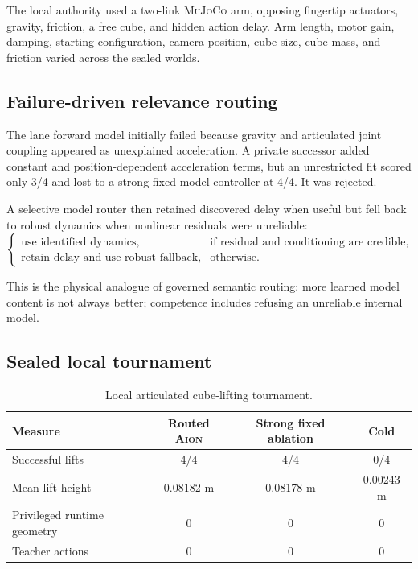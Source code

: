 \documentclass[11pt,a4paper]{article}
\newcommand{\AION}{\textsc{Aion}}
\newcommand{\MuJoCo}{\textsc{MuJoCo}}
\begin{document}
The local authority used a two-link \MuJoCo{} arm, opposing fingertip
actuators, gravity, friction, a free cube, and hidden action delay.  Arm length,
motor gain, damping, starting configuration, camera position, cube size, cube
mass, and friction varied across the sealed worlds.

\subsection{Failure-driven relevance routing}

The lane forward model initially failed because gravity and articulated joint
coupling appeared as unexplained acceleration.  A private successor added
constant and position-dependent acceleration terms, but an unrestricted fit
scored only 3/4 and lost to a strong fixed-model controller at 4/4.  It was
rejected.

A selective model router then retained discovered delay when useful but fell
back to robust dynamics when nonlinear residuals were unreliable:
\begin{equation}
\begin{cases}
\text{use identified dynamics}, & \text{if residual and conditioning are credible},\\
\text{retain delay and use robust fallback}, & \text{otherwise}.
\end{cases}
\label{eq:model-router}
\end{equation}

This is the physical analogue of governed semantic routing: more learned model
content is not always better; competence includes refusing an unreliable
internal model.

\subsection{Sealed local tournament}

\begin{table}[H]
\centering
\caption{Local articulated cube-lifting tournament.}
\begin{tabular}{lccc}
\toprule
Measure & Routed \AION{} & Strong fixed ablation & Cold \\
\midrule
Successful lifts & 4/4 & 4/4 & 0/4 \\
Mean lift height & 0.08182 m & 0.08178 m & 0.00243 m \\
Privileged runtime geometry & 0 & 0 & 0 \\
Teacher actions & 0 & 0 & 0 \\
\bottomrule
\end{tabular}
\end{table}
\end{document}
